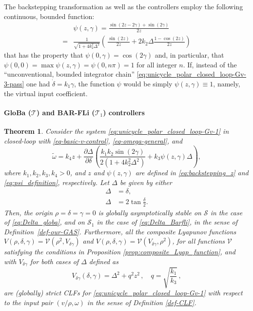 \documentclass[letterpaper, 10 pt, conference]{ieeeconf}  %
\newtheorem{theorem}{Theorem}
\begin{document}
The backstepping transformation as well as the controllers employ the following continuous, bounded function:
\begin{align}
&\psi(z,\gamma) = \frac{\sin(2z-2\gamma) +\sin(2\gamma)}{2z}
\nonumber\\
=& \frac{1}{\sqrt{1 + 4k_2^2 \Delta^2}} \left(\,\frac{\sin(2z)}{2z}
+ 2k_2 \Delta \frac{1 - \cos(2z)}{2z}\right)
 \label{eq:psi_definition}
\end{align}
that has the property that $\psi(0,\gamma)  = \cos(2\gamma)$ and, in particular, that $\psi(0,0) = \max\psi(z,\gamma)= \psi(0,n\pi) = 1$ for all integer $n$. If, instead of the ``unconventional, bounded integrator chain'' \eqref{eq:unicycle_polar_closed_loop-Gv-3-pass} one had $\dot\delta = k_1 \gamma$, the function $\psi$ would be simply $\psi(z,\gamma)\equiv 1$, namely, the virtual input coefficient.

\paragraph{GloBa ($\mathcal{T}$) and BAR-FLi ($\mathcal{T}_1$) controllers}
\begin{theorem}
\label{thm:backstepping_theorem}
Consider the system \eqref{eq:unicycle_polar_closed_loop-Gv-1} in closed-loop with \eqref{eq-basic-v-control}, \eqref{eq-omega-general}, and 
\begin{equation}
\tilde\omega = k_4 z + \dfrac{\partial \Delta}{\partial \delta} \left( \frac{k_1k_2 \sin(2\gamma)}{2(1+4k_2^2 \Delta^2)} + k_3 \psi(z,\gamma)\Delta \right),
\label{eq:backstepping_controllers}
\end{equation}
where $k_1,k_2,k_3,k_4 > 0$, and $z$ and $\psi(z,\gamma)$ are defined in \eqref{eq:backstepping_z} and \eqref{eq:psi_definition}, respectively. Let $\Delta$ be given by either
\begin{align}
\Delta &= \delta, \label{eq:Delta_globa} \\
\Delta &= 2 \tan \frac{\delta}{2}. \label{eq:Delta_Barfli}
\end{align}
Then, the origin $\rho = \delta = \gamma = 0$ is globally asymptotically stable on $\mathcal{S}$ in the case of \eqref{eq:Delta_globa}, and on $\mathcal{S}_1$ in the case of \eqref{eq:Delta_Barfli}, in the sense of Definition~\ref{def-our-GAS}.
Furthermore, all the composite Lyapunov functions $V(\rho, \delta, \gamma) = \mathcal{V}(\rho^2, V_{\delta \gamma})$ and $V(\rho, \delta, \gamma) = \mathcal{V}(V_{\delta \gamma},\rho^2)$, for all functions $\mathcal{V}$ satisfying the conditions in Proposition \ref{prop:composite_Lyap_function}, and with $V_{\delta \gamma}$ for both cases of $\Delta$ defined as
\begin{equation}
\label{eq:V_CLF_backstepping}
V_{\delta \gamma}(\delta, \gamma) = 
\Delta^2 + q^2z^2\,, \quad q = \sqrt{\frac{k_1}{k_3}}\,,
\end{equation}
are (globally) strict CLFs for \eqref{eq:unicycle_polar_closed_loop-Gv-1} with respect to the input pair $(v/\rho,\omega)$ in the sense of Definition \ref{def-CLF}. 
\end{theorem}
\end{document}
